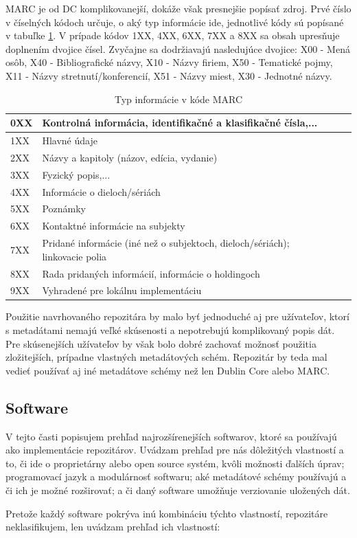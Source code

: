 \documentclass[thesis=M,slovak]{FITthesis}[2013/05/06]
\begin{document}
MARC je od DC komplikovanejší, dokáže však presnejšie popísať zdroj.
Prvé číslo v číselných kódoch určuje, o aký typ informácie ide, jednotlivé kódy sú popísané v tabuľke \ref{tab:marc}. V prípade kódov 1XX, 4XX, 6XX, 7XX a 8XX sa obsah upresňuje doplnením dvojice čísel. Zvyčajne sa dodržiavajú nasledujúce dvojice: X00 - Mená osôb, X40 - Bibliografické názvy, X10 - Názvy firiem, X50 - Tematické pojmy, X11 - Názvy stretnutí/konferencií, X51 - Názvy miest, X30 - Jednotné názvy.

\begin{table}\centering
 	\caption[MARC]{Typ informácie v kóde MARC}\label{tab:marc}
 	\begin{tabular}{|l|l|c|c|}\hline
0XX	& Kontrolná informácia, identifikačné a klasifikačné čísla,...\tabularnewline \hline
1XX	& Hlavné údaje \tabularnewline \hline
2XX	& Názvy a kapitoly (názov, edícia, vydanie) \tabularnewline \hline
3XX	& Fyzický popis,... \tabularnewline \hline
4XX	& Informácie o dieloch/sériách \tabularnewline \hline
5XX	& Poznámky \tabularnewline \hline
6XX	& Kontaktné informácie na subjekty \tabularnewline \hline
7XX	& Pridané informácie (iné než o subjektoch, dieloch/sériách); linkovacie polia \tabularnewline \hline
8XX	& Rada pridaných informácií, informácie o holdingoch \tabularnewline \hline
9XX	& Vyhradené pre lokálnu implementáciu \tabularnewline \hline
 	\end{tabular}
 \end{table}


Použitie navrhovaného repozitára by malo byť jednoduché aj pre užívateľov, ktorí s metadátami nemajú veľké skúsenosti a nepotrebujú komplikovaný popis dát. Pre skúsenejších užívateľov by však bolo dobré zachovať možnosť použitia zložitejších, prípadne vlastných metadátových schém. Repozitár by teda mal vedieť používať aj iné metadátove schémy než len Dublin Core alebo MARC.

\subsection{Software}
V tejto časti popisujem prehľad najrozšírenejších softwarov, ktoré sa používajú ako implementácie repozitárov. Uvádzam prehľad pre nás dôležitých vlastností a to, či ide o proprietárny alebo open source systém, kvôli možnosti ďalších úprav; programovací jazyk a modulárnosť softwaru; aké metadátové schémy používajú a či ich je možné rozširovať; a či daný software umožňuje verziovanie uložených dát.

Pretože každý software pokrýva inú kombináciu týchto vlastností, repozitáre neklasifikujem, len uvádzam prehľad ich vlastností:
\end{document}
